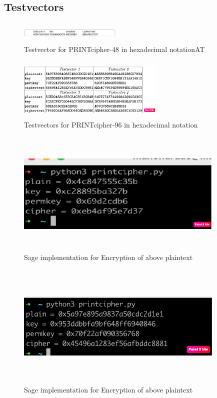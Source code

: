 \documentclass[journal=tosc,preprint]{iacrtrans}
\begin{document}
\newpage
\subsection{Testvectors}
\begin{figure}[ht]
	\centering
	\includegraphics[height=1cm, width=5cm]{pics/testvector1.png}
	\caption{Testvector for PRINTcipher-48 in hexadecimal notationAT}
\end{figure}
\begin{figure}[ht]
	\centering
	\includegraphics[height=3cm, width=7cm]{pics/testvector-2.png}
	\caption{Testvectors for PRINTcipher-96 in hexadecimal notation}
\end{figure}
\begin{figure}[ht]
	\centering
	\includegraphics[height=6cm, width=10cm]{pics/pic_1.png}
	\caption{Sage implementation for Encryption of above plaintext}
\end{figure}
\begin{figure}[ht]
	\centering
	\includegraphics[height=6cm, width=10cm]{pics/pic_2.png}
	\caption{Sage implementation for Encryption of above plaintext}
\end{figure}
\end{document}
